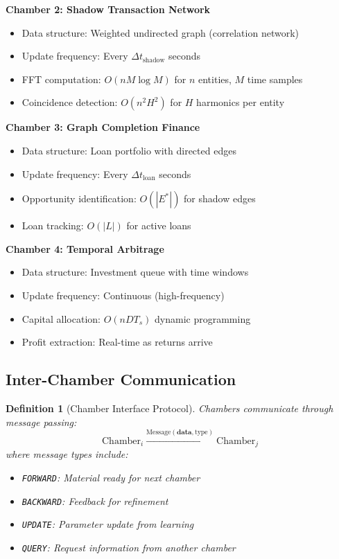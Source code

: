\documentclass[12pt]{article}
\newtheorem{definition}[theorem]{Definition}
\begin{document}
\textbf{Chamber 2: Shadow Transaction Network}
\begin{itemize}
    \item Data structure: Weighted undirected graph (correlation network)
    \item Update frequency: Every $\Delta t_{\text{shadow}}$ seconds
    \item FFT computation: $O(n M \log M)$ for $n$ entities, $M$ time samples
    \item Coincidence detection: $O(n^2 H^2)$ for $H$ harmonics per entity
\end{itemize}

\textbf{Chamber 3: Graph Completion Finance}
\begin{itemize}
    \item Data structure: Loan portfolio with directed edges
    \item Update frequency: Every $\Delta t_{\text{loan}}$ seconds
    \item Opportunity identification: $O(|E^*|)$ for shadow edges
    \item Loan tracking: $O(|L|)$ for active loans
\end{itemize}

\textbf{Chamber 4: Temporal Arbitrage}
\begin{itemize}
    \item Data structure: Investment queue with time windows
    \item Update frequency: Continuous (high-frequency)
    \item Capital allocation: $O(n D T_s)$ dynamic programming
    \item Profit extraction: Real-time as returns arrive
\end{itemize}

\subsection{Inter-Chamber Communication}

\begin{definition}[Chamber Interface Protocol]
Chambers communicate through message passing:
$$
\text{Chamber}_i \xrightarrow{\text{Message}(\mathbf{data}, \text{type})} \text{Chamber}_j
$$
where message types include:
\begin{itemize}
    \item \texttt{FORWARD}: Material ready for next chamber
    \item \texttt{BACKWARD}: Feedback for refinement
    \item \texttt{UPDATE}: Parameter update from learning
    \item \texttt{QUERY}: Request information from another chamber
\end{itemize}
\end{definition}
\end{document}
